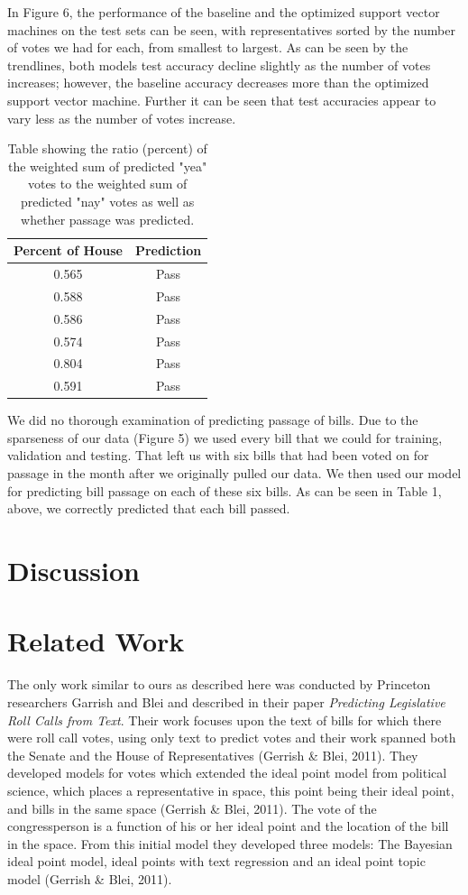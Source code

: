 \documentclass[11pt,letterpaper,twocolumn]{article}
\begin{document}
In Figure 6, the performance of the baseline and the optimized support vector machines on the test sets can be seen, with representatives sorted by the number of votes we had for each, from smallest to largest. As can be seen by the trendlines, both models test accuracy decline slightly as the number of votes increases; however, the baseline accuracy decreases more than the optimized support vector machine. Further it can be seen that test accuracies appear to vary less as the number of votes increase.

\begin{table}
\centering
\begin{tabular}{|c|c|} \hline
Percent of House & Prediction \\ \hline
0.565 & Pass \\ \hline
0.588 & Pass\\ \hline
0.586 & Pass\\ \hline
0.574 & Pass\\ \hline
0.804 & Pass\\ \hline
0.591 & Pass\\ \hline
\end{tabular}
\caption{Table showing the ratio (percent) of the weighted sum of predicted "yea" votes to the weighted sum of predicted "nay" votes as well as whether passage was predicted.}
\end{table}

We did no thorough examination of predicting passage of bills. Due to the sparseness of our data (Figure 5) we used every bill that we could for training, validation and testing. That left us with six bills that had been voted on for passage in the month after we originally pulled our data. We then used our model for predicting bill passage on each of these six bills. As can be seen in Table 1, above, we correctly predicted that each bill passed. 

\section{Discussion}

\section{Related Work}

The only work similar to ours as described here was conducted by Princeton researchers Garrish and Blei and described in their paper \textit{Predicting Legislative Roll Calls from Text}. Their work focuses upon the text of bills for which there were roll call votes, using only text to predict votes and their work spanned both the Senate and the House of Representatives (Gerrish \& Blei, 2011). They developed models for votes which extended the ideal point model from political science, which places a representative in space, this point being their ideal point, and bills in the same space (Gerrish \& Blei, 2011). The vote of the congressperson is a function of his or her ideal point and the location of the bill in the space. From this initial model they developed three models: The Bayesian ideal point model, ideal points with text regression and an ideal point topic model (Gerrish \& Blei, 2011). 
\end{document}
